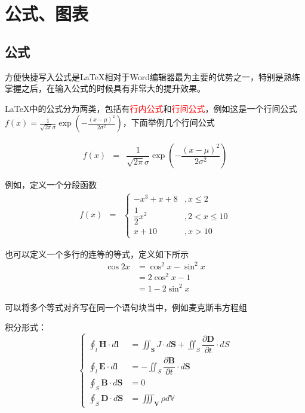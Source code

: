 \newcommand{\red}[1]{{\textcolor{red}{#1}}}%
\newcommand{\argmin}{\mathop{\mathrm{argmin}}\limits}
\newcommand{\argmax}{\mathop{\mathrm{argmax}}\limits}
\chapter{公式、图表}
\section{公式}

方便快捷写入公式是\LaTeX 相对于Word编辑器最为主要的优势之一，特别是熟练掌握之后，在输入公式的时候具有非常大的提升效果。


\LaTeX 中的公式分为两类，包括有\red{行内公式}和\red{行间公式}，例如这是一个行间公式$f(x)=\frac{1}{\sqrt{2\pi}\sigma}\exp\left(-\frac{(x-\mu)^{2}}{2\sigma^{2}}\right)$，下面举例几个行间公式

\begin{eqnarray}
    f(x)&=&\dfrac{1}{\sqrt{2\pi}\sigma}\exp\left(-\dfrac{(x-\mu)^{2}}{2\sigma^{2}}\right)
\end{eqnarray}

例如，定义一个分段函数
\begin{eqnarray}
    f(x)&=&\begin{cases}
        -x^{3}+x+8        & ,x\leq{2}    \\
        \dfrac{1}{2}x^{2} & ,2<x\leq{10} \\
        x+10              & ,x>10
    \end{cases}
\end{eqnarray}

也可以定义一个多行的连等的等式，定义如下所示
\begin{eqnarray}
    \cos{2x}&=\cos^{2}x-\sin^{2}x\\
    &=2\cos^{2}x-1\\
    &=1-2\sin^{2}x
\end{eqnarray}

可以将多个等式对齐写在同一个语句块当中，例如麦克斯韦方程组

积分形式：
\begin{equation}
    \begin{cases}
        \displaystyle\oint_{l}\mathbf{H}\cdot{d}\mathbf{l} & =\displaystyle\iint_\mathbf{S}J\cdot{d}\mathbf{S}+\displaystyle\iint_{S}\dfrac{\partial\mathbf{D}}{\partial{t}}\cdot{dS} \\
        \displaystyle\oint_{l}\mathbf{E}\cdot{d}\mathbf{l} & =-\displaystyle\iint_{S}\dfrac{\partial\mathbf{B}}{\partial{t}}\cdot{d}\mathbf{S}                                        \\
        \displaystyle\oint_{S}\mathbf{B}\cdot{d}\mathbf{S} & =0                                                                                                                       \\
        \displaystyle\oint_{S}\mathbf{D}\cdot{d}\mathbf{S} & =\displaystyle\iiint_\mathbf{V}\rho{d}\mathbb{V}
    \end{cases}
\end{equation}

